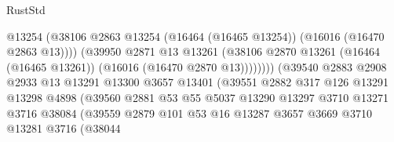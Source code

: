 \begin{lexlean}{RustStd}
\begin{coremodule}
                                            @13254
                                            (@38106
                                              @2863
                                              @13254
                                              (@16464 (@16465 @13254))
                                              (@16016 (@16470 @2863 @13))))
                                          (@39950
                                            @2871
                                            @13
                                            @13261
                                            (@38106
                                              @2870
                                              @13261
                                              (@16464 (@16465 @13261))
                                              (@16016 (@16470 @2870 @13))))))))
                                  (@39540
                                    @2883
                                    @2908
                                    @2933
                                    @13
                                    @13291
                                    @13300
                                    @3657
                                    @13401
                                    (@39551
                                      @2882
                                      @317
                                      @126
                                      @13291
                                      @13298
                                      @4898
                                      (@39560
                                        @2881
                                        @53
                                        @55
                                        @5037
                                        @13290
                                        @13297
                                        @3710
                                        @13271
                                        @3716
                                        @38084
                                        (@39559
                                          @2879
                                          @101
                                          @53
                                          @16
                                          @13287
                                          @3657
                                          @3669
                                          @3710
                                          @13281
                                          @3716
                                          (@38044

\end{coremodule}
\end{lexlean}
